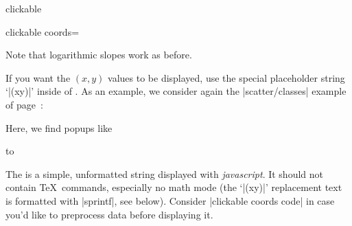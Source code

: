 \begin{pgfplotslibrary}{clickable}
\begin{pgfplotskey}{clickable coords=}
{	Note that logarithmic slopes work as before.
	
	If you want the $(x,y)$ values to be displayed, use the special placeholder string `|(xy)|' inside of . As an example, we consider again the |scatter/classes| example of page~\pageref{pgfplots:scatterclasses}:

\begin{codeexample}[]
\end{codeexample}
}
	\noindent Here, we find popups like

	\noindent\hbox to %

	The  is a simple, unformatted string displayed with \emph{javascript}. It should not contain \TeX\ commands, especially no math mode (the `|(xy)|' replacement text is formatted with |sprintf|, see below). Consider |clickable coords code| in case you'd like to preprocess data before displaying it.


\end{pgfplotskey}
\end{pgfplotslibrary}
